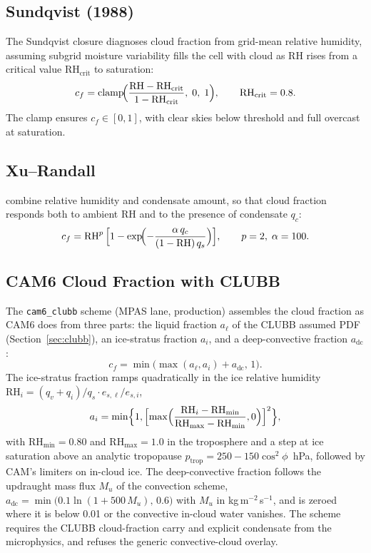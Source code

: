 \documentclass[11pt,twoside]{report}
\begin{document}
\subsection{Sundqvist (1988)}

The Sundqvist closure \citep{Sundqvist1989} diagnoses cloud fraction from
grid-mean relative humidity, assuming subgrid moisture variability fills the
cell with cloud as RH rises from a critical value $\mathrm{RH}_{\mathrm{crit}}$
to saturation:
\begin{equation}
  c_f = \mathrm{clamp}\!\Bigl(\frac{\mathrm{RH}-\mathrm{RH}_{\mathrm{crit}}}
  {1-\mathrm{RH}_{\mathrm{crit}}},\;0,\;1\Bigr),
  \qquad \mathrm{RH}_{\mathrm{crit}}=0.8.
\end{equation}
The clamp ensures $c_f\in[0,1]$, with clear skies below threshold and full
overcast at saturation.

\subsection{Xu--Randall}

\citet{XuRandall1996} combine relative humidity and condensate amount, so that cloud fraction
responds both to ambient RH and to the presence of condensate $q_c$:
\begin{equation}
  c_f = \mathrm{RH}^p\,\Bigl[1-\exp\!\Bigl(
  -\frac{\alpha\,q_c}{(1-\mathrm{RH})\,q_s}\Bigr)\Bigr],
  \qquad p=2,\;\alpha=100.
\end{equation}

\subsection{CAM6 Cloud Fraction with CLUBB}
\label{sec:cam6-clouds}

The \texttt{cam6\_clubb} scheme (MPAS lane, production) assembles the cloud
fraction as CAM6 does from three parts: the liquid fraction $a_{\ell}$ of the
CLUBB assumed PDF (Section~\ref{sec:clubb}), an ice-stratus fraction
$a_i$, and a deep-convective fraction $a_{\mathrm{dc}}$:
\begin{equation}
  c_f=\min\bigl(\max(a_\ell,a_i)+a_{\mathrm{dc}},\,1\bigr).
\end{equation}
The ice-stratus fraction ramps quadratically in the ice relative humidity
$\mathrm{RH}_i=(q_v+q_i)/q_s\cdot e_{s,\ell}/e_{s,i}$,
\begin{equation}
  a_i=\min\Bigl\{1,\Bigl[\max\Bigl(\frac{\mathrm{RH}_i-\mathrm{RH}_{\min}}
  {\mathrm{RH}_{\max}-\mathrm{RH}_{\min}},0\Bigr)\Bigr]^2\Bigr\},
\end{equation}
with $\mathrm{RH}_{\min}=0.80$ and $\mathrm{RH}_{\max}=1.0$ in the
troposphere and a step at ice saturation above an analytic tropopause
$p_{\mathrm{trop}}=250-150\cos^2\phi$~hPa, followed by CAM's limiters on
in-cloud ice.  The deep-convective fraction follows the updraught mass flux
$M_u$ of the convection scheme,
$a_{\mathrm{dc}}=\min\bigl(0.1\ln(1+500\,M_u),\,0.6\bigr)$ with $M_u$ in
kg\,m$^{-2}$\,s$^{-1}$, and is zeroed
where it is below 0.01 or the convective in-cloud water vanishes.  The scheme
requires the CLUBB cloud-fraction carry and explicit condensate from the
microphysics, and refuses the generic convective-cloud overlay.
\end{document}

